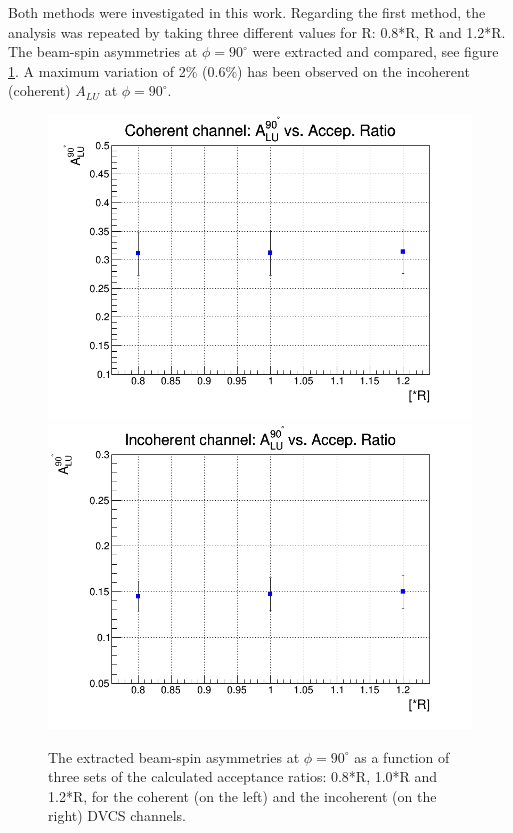 Both methods were investigated in this work. Regarding the first method, the 
analysis was repeated by taking three different values for R: 0.8*R, R and 
1.2*R. The beam-spin asymmetries at $\phi = 90^{\circ}$ were extracted and 
compared, see figure \ref{fig:background_sub_sys_uncer}. A maximum variation of 
2$\%$ (0.6$\%$) has been observed on the incoherent (coherent) $A_{LU}$ at 
$\phi = 90^{\circ}$. 

\begin{figure}[tp]
\includegraphics[scale=0.30]{fig_dvcs/final_coh_BSA_NR.png}
\includegraphics[scale=0.30]{fig_dvcs/final_incoh_BSA_NR.png}
\caption{The extracted beam-spin asymmetries at $\phi = 90^{\circ}$ as a 
function of three sets of the calculated acceptance ratios: 0.8*R, 1.0*R and 
1.2*R, for the coherent (on the left) and the incoherent (on the right) DVCS 
channels.} \label{fig:background_sub_sys_uncer}
\end{figure}

